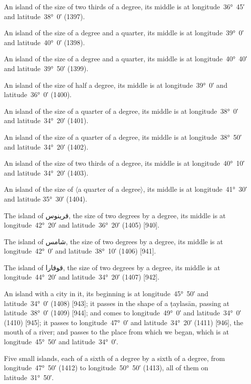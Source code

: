 \documentclass[11pt]{article}
\newcommand{\Pg}[1]{\marginpar{\footnotesize #1}}
\newcommand{\Ang}[1]{\ensuremath{#1}}
\begin{document}
An island of the size of two thirds of a degree, its middle is at longitude~36°~45′ and latitude~38°~0′ (1397).

An island of the size of a degree and a quarter, its middle is at longitude~39°~0′ and latitude~40°~0′ (1398).

An island of the size of a degree and a quarter, its middle is at longitude~40°~40′ and latitude~39°~50′ (1399).

An island of the size of half a degree, its middle is at longitude~39°~0′ and latitude~36°~0′ (1400).

An island of the size of a quarter of a degree, its middle is at longitude~38°~0′ and latitude~34°~20′ (1401).

An island of the size of a quarter of a degree, its middle is at longitude~38°~50′ and latitude~34°~20′ (1402).

An island of the size of two thirds of a degree, its middle is at longitude~40°~10′ and latitude~34°~20′ (1403).

An island of the size of \Ang{\langle}a quarter of a degree\Ang{\rangle}, its middle is at longitude~41°~30′ and latitude 35°~30′ (1404).

The island of \textarabic{قرينوس}, the size of two degrees by a degree, its middle is at longitude~42°~20′ and latitude~36°~20′ (1405) [940].

The island of \textarabic{شامس}, the size of two degrees by a degree, its middle is at longitude~42°~0′ and latitude~38°~10′ (1406) [941].

The island of \textarabic{قوقارا}, the size of two degrees by a degree, its middle is at longitude~44°~20′ and latitude~34°~20′ (1407) [942].

An island with a city in it, its beginning is at longitude~45°~50′ and latitude~34°~0′ (1408) [943]\Pg{p. 92}; it passes in the shape of a ṭaylasān, passing at latitude~38°~0′ (1409) [944]; and comes to longitude~49°~0′ and latitude~34°~0′ (1410) [945]; it passes to longitude~47°~0′ and latitude~34°~20′ (1411) [946], the mouth of a river; and passes to the place from which we began, which is at longitude~45°~50′ and latitude~34°~0′.

Five small islands, each of a sixth of a degree by a sixth of a degree, from longitude~47°~50′ (1412) to longitude~50°~50′ (1413), all of them on latitude~31°~50′.
\end{document}
